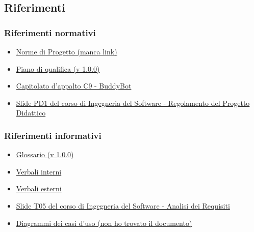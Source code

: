 \subsection{Riferimenti}
\subsubsection{Riferimenti normativi}
\begin{itemize}
    \item \href{https://www.sito2.com}{Norme di Progetto (manca link)}
    \item \href{https://github.com/SWEg-Labs/Documentazione/blob/adea4950d9135916b22ef3af717e955f2c11f975/output/RTB/Documentazione%20esterna/piano_qualifica_v1.0.0.pdf}{Piano di qualifica (v 1.0.0)}
    \item \href{https://www.math.unipd.it/~tullio/IS-1/2024/Progetto/C9.pdf}{Capitolato d'appalto C9 - BuddyBot}
    \item \href{https://www.math.unipd.it/~tullio/IS-1/2024/Dispense/PD1.pdf}{Slide PD1 del corso di Ingegneria del Software - Regolamento del Progetto Didattico}
  \end{itemize}

\subsubsection{Riferimenti informativi}
\begin{itemize}
    \item \href{https://github.com/SWEg-Labs/Documentazione/blob/adea4950d9135916b22ef3af717e955f2c11f975/output/RTB/Documentazione%20esterna/glossario_v1.0.0.pdf}{Glossario (v 1.0.0)}
    \item \href{https://github.com/SWEg-Labs/Documentazione/tree/adea4950d9135916b22ef3af717e955f2c11f975/output/RTB/Documentazione%20interna/Verbali%20interni}{Verbali interni}
    \item \href{https://github.com/SWEg-Labs/Documentazione/tree/adea4950d9135916b22ef3af717e955f2c11f975/output/RTB/Documentazione%20esterna/Verbali%20esterni}{Verbali esterni}
    \item \href{https://www.math.unipd.it/~tullio/IS-1/2024/Dispense/T05.pdf}{Slide T05 del corso di Ingegneria del Software - Analisi dei Requisiti}
    \item \href{https://www.sito3.com}{Diagrammi dei casi d'uso (non ho trovato il documento)}
  \end{itemize}
